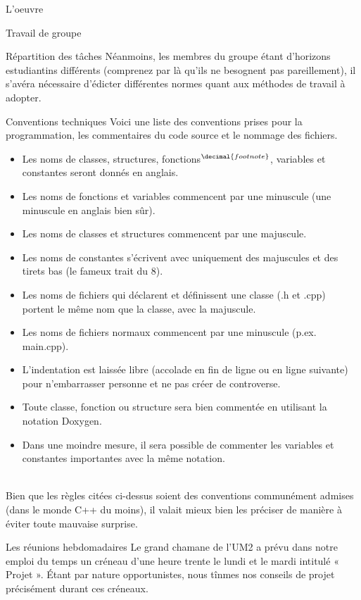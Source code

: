 \documentclass[a4paper, 12pt]{report}
\begin{document}
\begin{part}{L'oeuvre}
\begin{chapter}{Travail de groupe}
\begin{section}{Répartition des tâches}
				Néanmoins, les membres du groupe étant d'horizons estudiantins différents (comprenez par là qu'ils ne besognent pas pareillement),
				il s'avéra nécessaire d'édicter différentes normes quant aux méthodes de travail à adopter.

			\end{section}
			\begin{section}{Conventions techniques}
				Voici une liste des conventions prises pour la programmation, les commentaires du code source et le nommage des fichiers.
				\addtocounter{footnote}{2}
				\footnotetext[\value{footnote}]{Le nom de fonction désigne aussi les méthodes.}
				\begin{itemize}
					\item Les noms de classes, structures, fonctions$^{\decimal{footnote}}$, variables et constantes seront donnés en anglais.
					\item Les noms de fonctions et variables commencent par une minuscule (une minuscule en anglais bien sûr).
					\item Les noms de classes et structures commencent par une majuscule.
					\item Les noms de constantes s'écrivent avec uniquement des majuscules et des tirets bas (le fameux trait du 8).
					\item Les noms de fichiers qui déclarent et définissent une classe (.h et .cpp) portent le même nom que la classe, avec la
					majuscule.
					\item Les noms de fichiers normaux commencent par une minuscule (p.ex. main.cpp).
					\item L'indentation est laissée libre (accolade en fin de ligne ou en ligne suivante) pour n'embarrasser personne et ne pas
					créer de controverse.
					\item Toute classe, fonction ou structure sera bien commentée en utilisant la notation \gls{Doxygen}.
					\item Dans une moindre mesure, il sera possible de commenter les variables et constantes importantes avec la même notation.
				\end{itemize}~\\

				Bien que les règles citées ci-dessus soient des conventions communément admises (dans le monde C++ du moins), il valait mieux
				bien les préciser de manière à éviter toute mauvaise surprise.
			\end{section}
			\begin{section}{Les réunions hebdomadaires}
				Le grand chamane de l'UM2 a prévu dans notre emploi du temps un créneau d'une heure trente le lundi et le mardi intitulé « Projet ».
				Étant par nature opportunistes, nous tînmes nos conseils de projet précisément durant ces créneaux.\\



\end{section}
\end{chapter}
\end{part}
\end{document}
